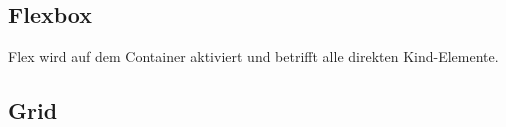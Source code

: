 \subsection{Flexbox}
Flex wird auf dem Container aktiviert und betrifft alle direkten Kind-Elemente. 

\subsection{Grid}





